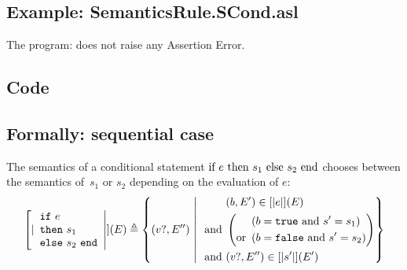 \documentclass{book}
\begin{document}
    \subsection{Example: SemanticsRule.SCond.asl}
    The program:
    does not raise any Assertion Error.

  \subsection{Code}

\begin{formal}
  \subsection{Formally: sequential case}
  The semantics of a conditional statement $\text{if}\ e\ \text{then}\ s_1\ \text{else}\ s_2\ \text{end}$ chooses between
  the semantics of~$s_1$ or $s_2$ depending on the evaluation of $e$:
  \begin{align}
    \interp{\begin{array}{l}
      \syntt{if}\ e\\
      \syntt{then}\ s_1\\
      \syntt{else}\ s_2\ \syntt{end}
    \end{array}} (E) \triangleq
      \left\{ (v?, E'') \st{} \ 
      \begin{aligned}
        & (b, E') \in \interp{e} (E)
        \\ \text{and}\ &
        \left( \begin{aligned}
          & \left(b = \syntt{true} \ \text{and} \ s' = s_1 \right)
          \\ \text{or}\ &
          \left( b = \syntt{false} \ \text{and}\ s' = s_2 \right)
        \end{aligned} \right)
        \\ \text{and}\ &
        (v?, E'') \in \interp{s'} (E')
      \end{aligned}
      \right\}
    \label{eq:sem-seq-scond}
  \end{align}


\end{formal}
\end{document}
